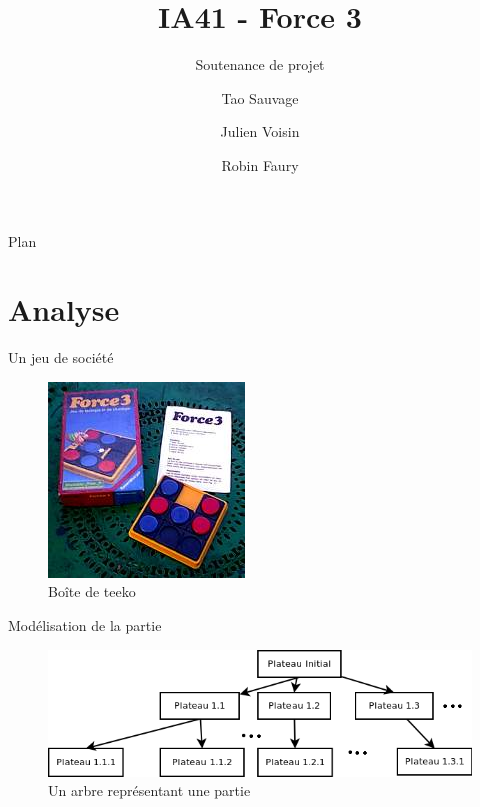 \documentclass[compress, 12pt]{beamer}
\title{IA41 - Force 3}
\subtitle{Soutenance de projet}
\author[]{Tao Sauvage \and Julien Voisin \and Robin Faury}
\institute[UTBM]{Université de Technologie de Belfort Montbéliard}
\begin{document}
\begin{frame}
	\titlepage
\end{frame}


\begin{frame}{Plan}
    \tableofcontents
\end{frame}


\section{Analyse}

\begin{frame}{Un jeu de société}
  \begin{figure}
    \includegraphics[height=0.6\textheight]{./pix/plateau}
    \centering
    \caption{Boîte de teeko}
  \end{figure}
\end{frame}


\begin{frame}{Modélisation de la partie}
  \begin{figure}
    \includegraphics[width=\textwidth]{./pix/arbre}
    \centering
    \caption{Un arbre représentant une partie}
  \end{figure}
\end{frame}
\end{document}
